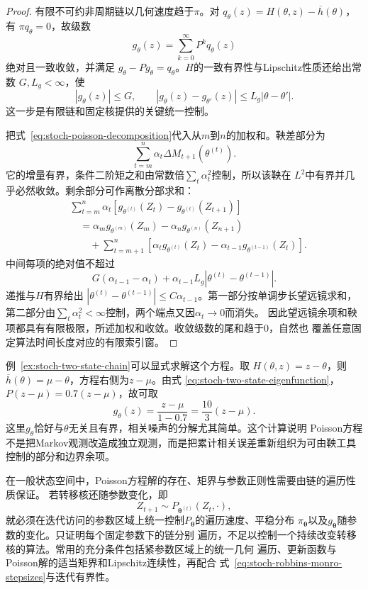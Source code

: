 \begin{proof}
有限不可约非周期链以几何速度趋于$\pi$。对
$q_\theta(z)=H(\theta,z)-\overline h(\theta)$，有
$\pi q_\theta=0$，故级数
\[
  g_\theta(z)=\sum_{k=0}^{\infty}P^kq_\theta(z)
\]
绝对且一致收敛，并满足
$g_\theta-Pg_\theta=q_\theta$。$H$的一致有界性与Lipschitz性质还给出常数
$G,L_g<\infty$，使
\[
  |g_\theta(z)|\leq G,\qquad
  |g_\theta(z)-g_{\theta'}(z)|
  \leq L_g|\theta-\theta'|.
\]
这一步是有限链和固定核提供的关键统一控制。

把式~\eqref{eq:stoch-poisson-decomposition}代入从$m$到$n$的加权和。鞅差部分为
\[
  \sum_{t=m}^{n}\alpha_t
  \Delta M_{t+1}(\theta^{(t)}).
\]
它的增量有界，条件二阶矩之和由常数倍$\sum_t\alpha_t^2$控制，所以该鞅在
$L^2$中有界并几乎必然收敛。剩余部分可作离散分部求和：
\begin{align*}
  &\sum_{t=m}^{n}\alpha_t
  \left[
    g_{\theta^{(t)}}(Z_t)-g_{\theta^{(t)}}(Z_{t+1})
  \right]\\
  &\quad=
  \alpha_mg_{\theta^{(m)}}(Z_m)
  -\alpha_ng_{\theta^{(n)}}(Z_{n+1})\\
  &\qquad+
  \sum_{t=m+1}^{n}
  \left[
    \alpha_tg_{\theta^{(t)}}(Z_t)
    -\alpha_{t-1}g_{\theta^{(t-1)}}(Z_t)
  \right].
\end{align*}
中间每项的绝对值不超过
\[
  G(\alpha_{t-1}-\alpha_t)
  +
  \alpha_{t-1}L_g
  |\theta^{(t)}-\theta^{(t-1)}|.
\]
递推与$H$有界给出
$|\theta^{(t)}-\theta^{(t-1)}|\leq C\alpha_{t-1}$。第一部分按单调步长望远镜求和，
第二部分由$\sum_t\alpha_t^2<\infty$控制，两个端点又因$\alpha_t\to0$而消失。
因此望远镜余项和鞅项都具有有限极限，所述加权和收敛。收敛级数的尾和趋于$0$，自然也
覆盖任意固定算法时间长度对应的有限索引窗。
\end{proof}

例~\ref{ex:stoch-two-state-chain}可以显式求解这个方程。取
$H(\theta,z)=z-\theta$，则
$\overline h(\theta)=\mu-\theta$，方程右侧为$z-\mu$。由式
\eqref{eq:stoch-two-state-eigenfunction}，
$P(z-\mu)=0.7(z-\mu)$，故可取
\[
  g_\theta(z)=\frac{z-\mu}{1-0.7}=\frac{10}{3}(z-\mu).
\]
这里$g_\theta$恰好与$\theta$无关且有界，相关噪声的分解尤其简单。这个计算说明
Poisson方程不是把Markov观测改造成独立观测，而是把累计相关误差重新组织为可由鞅工具
控制的部分和边界余项。

在一般状态空间中，Poisson方程解的存在、矩界与参数正则性需要由链的遍历性质保证。
若转移核还随参数变化，即
\[
  Z_{t+1}\sim P_{\bm{\theta}^{(t)}}(Z_t,\cdot),
\]
就必须在迭代访问的参数区域上统一控制$P_{\bm{\theta}}$的遍历速度、平稳分布
$\pi_{\bm{\theta}}$以及$g_{\bm{\theta}}$随参数的变化。只证明每个固定参数下的链分别
遍历，不足以控制一个持续改变转移核的算法。常用的充分条件包括紧参数区域上的统一几何
遍历、更新函数与Poisson解的适当矩界和Lipschitz连续性，再配合
式~\eqref{eq:stoch-robbins-monro-stepsizes}与迭代有界性。

